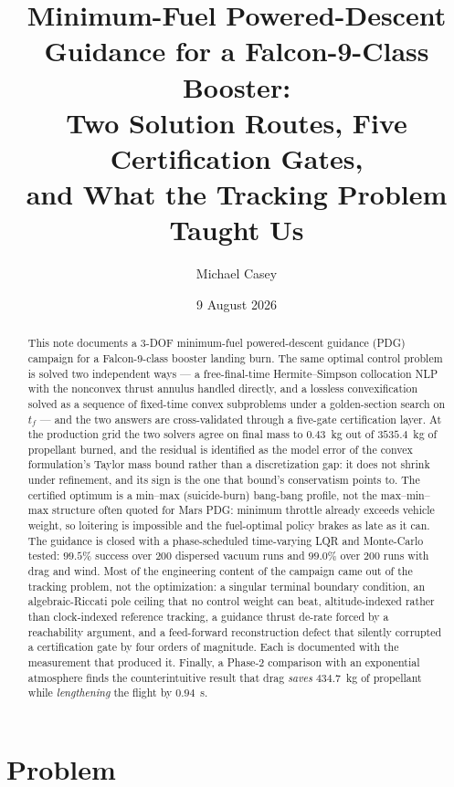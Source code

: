 \documentclass[11pt]{article}
\title{Minimum-Fuel Powered-Descent Guidance for a Falcon-9-Class Booster:\\
Two Solution Routes, Five Certification Gates,\\
and What the Tracking Problem Taught Us}
\author{Michael Casey}
\date{9 August 2026}
\begin{document}
\maketitle

\begin{abstract}
This note documents a 3-DOF minimum-fuel powered-descent guidance (PDG)
campaign for a Falcon-9-class booster landing burn. The same optimal
control problem is solved two independent ways --- a free-final-time
Hermite--Simpson collocation NLP with the nonconvex thrust annulus handled
directly, and a lossless convexification solved as a sequence of fixed-time
convex subproblems under a golden-section search on $t_f$ --- and the two
answers are cross-validated through a five-gate certification layer. At the
production grid the two solvers agree on final mass to $0.43$~kg out of
$3535.4$~kg of propellant burned, and the residual is identified as the
model error of the convex formulation's Taylor mass bound rather than a
discretization gap: it does not shrink under refinement, and its sign is
the one that bound's conservatism points to. The certified optimum is
a min--max (suicide-burn) bang-bang profile, not the max--min--max structure
often quoted for Mars PDG: minimum throttle already exceeds vehicle weight,
so loitering is impossible and the fuel-optimal policy brakes as late as it
can. The guidance is closed with a phase-scheduled time-varying LQR and
Monte-Carlo tested: $99.5\%$ success over $200$ dispersed vacuum runs and
$99.0\%$ over $200$ runs with drag and wind. Most of the engineering content
of the campaign came out of the tracking problem, not the optimization: a
singular terminal boundary condition, an algebraic-Riccati pole ceiling that
no control weight can beat, altitude-indexed rather than clock-indexed
reference tracking, a guidance thrust de-rate forced by a reachability
argument, and a feed-forward reconstruction defect that silently corrupted a
certification gate by four orders of magnitude. Each is documented with the
measurement that produced it. Finally, a Phase-2 comparison with an
exponential atmosphere finds the counterintuitive result that drag
\emph{saves} $434.7$~kg of propellant while \emph{lengthening} the flight by
$0.94$~s.
\end{abstract}

\tableofcontents

\section{Problem}
\label{sec:problem}
\end{document}
